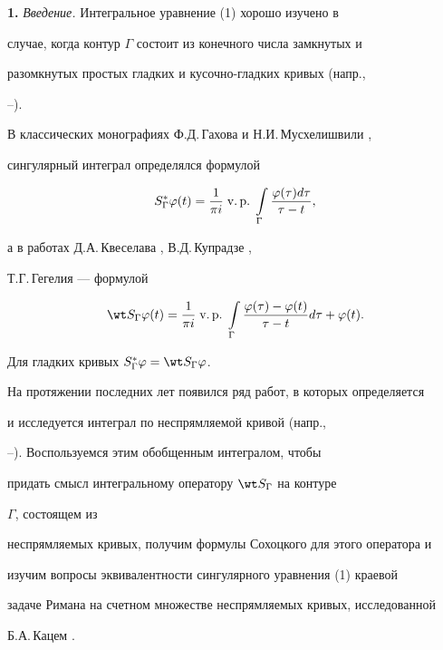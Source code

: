 {\bf 1.} {\it Введение.} Интегральное уравнение (1) хорошо изучено в


случае, когда контур $\Gamma$ состоит из конечного числа замкнутых и


разомкнутых простых гладких и кусочно-гладких кривых (напр.,


\cite{1}--\cite{5}).





В классических монографиях Ф.Д.\,Гахова и Н.И.\,Мусхелишвили \cite{1},


\cite{2} сингулярный интеграл определялся формулой


$$


S^*_\Gamma\varphi(t)=\frac{1}{\pi i}\text{\;v.\,p.\;}


\int\limits_\Gamma\frac{\varphi(\tau)d\tau}{\tau-t},


$$


а в работах Д.А.\,Квеселава \cite{3}, В.Д.\,Купрадзе \cite{4},


Т.Г.\,Гегелия \cite{5} --- формулой


$$


\wt S_\Gamma\varphi(t)=\frac{1}{\pi i}\text{\;v.\,p.\;}


\int\limits_\Gamma\frac{\varphi(\tau)-\varphi(t)}{\tau-t}d\tau+\varphi(t).


$$


Для гладких кривых $S^*_\Gamma\varphi=\wt S_\Gamma\varphi$.





На протяжении последних лет появился ряд работ, в которых определяется


и исследуется интеграл по неспрямляемой кривой (напр.,


\cite{6}--\cite{10}). Воспользуемся этим обобщенным интегралом, чтобы


придать смысл интегральному оператору $\wt S_\Gamma$ на контуре


$\Gamma$, состоящем из


неспрямляемых кривых, получим формулы Сохоцкого для этого оператора и


изучим вопросы эквивалентности сингулярного уравнения (1) краевой


задаче Римана на счетном множестве неспрямляемых кривых, исследованной


Б.А.\,Кацем \cite{11}.


\medskip





